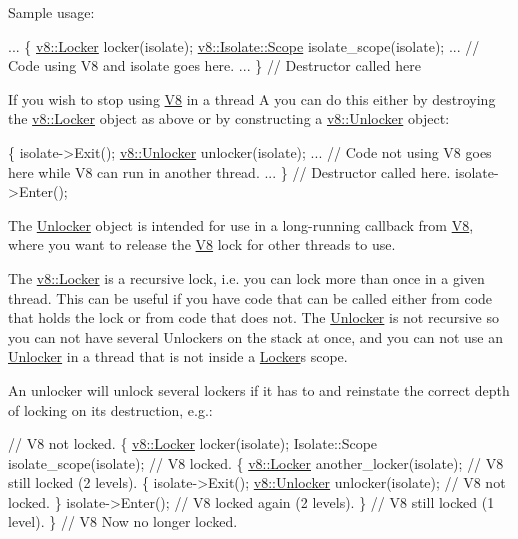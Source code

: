 Sample usage\+: 
\begin{DoxyCode}
...
\{
  \mbox{\hyperlink{classv8_1_1Locker}{v8::Locker}} locker(isolate);
  \mbox{\hyperlink{classv8_1_1Isolate_1_1Scope}{v8::Isolate::Scope}} isolate\_scope(isolate);
  ...
  \textcolor{comment}{// Code using V8 and isolate goes here.}
  ...
\} \textcolor{comment}{// Destructor called here}
\end{DoxyCode}


If you wish to stop using \mbox{\hyperlink{classv8_1_1V8}{V8}} in a thread A you can do this either by destroying the \mbox{\hyperlink{classv8_1_1Locker}{v8\+::\+Locker}} object as above or by constructing a \mbox{\hyperlink{classv8_1_1Unlocker}{v8\+::\+Unlocker}} object\+:


\begin{DoxyCode}
\{
  isolate->Exit();
  \mbox{\hyperlink{classv8_1_1Unlocker}{v8::Unlocker}} unlocker(isolate);
  ...
  \textcolor{comment}{// Code not using V8 goes here while V8 can run in another thread.}
  ...
\} \textcolor{comment}{// Destructor called here.}
isolate->Enter();
\end{DoxyCode}


The \mbox{\hyperlink{classv8_1_1Unlocker}{Unlocker}} object is intended for use in a long-\/running callback from \mbox{\hyperlink{classv8_1_1V8}{V8}}, where you want to release the \mbox{\hyperlink{classv8_1_1V8}{V8}} lock for other threads to use.

The \mbox{\hyperlink{classv8_1_1Locker}{v8\+::\+Locker}} is a recursive lock, i.\+e. you can lock more than once in a given thread. This can be useful if you have code that can be called either from code that holds the lock or from code that does not. The \mbox{\hyperlink{classv8_1_1Unlocker}{Unlocker}} is not recursive so you can not have several Unlockers on the stack at once, and you can not use an \mbox{\hyperlink{classv8_1_1Unlocker}{Unlocker}} in a thread that is not inside a \mbox{\hyperlink{classv8_1_1Locker}{Locker}}\textquotesingle{}s scope.

An unlocker will unlock several lockers if it has to and reinstate the correct depth of locking on its destruction, e.\+g.\+:


\begin{DoxyCode}
\textcolor{comment}{// V8 not locked.}
\{
  \mbox{\hyperlink{classv8_1_1Locker}{v8::Locker}} locker(isolate);
  Isolate::Scope isolate\_scope(isolate);
  \textcolor{comment}{// V8 locked.}
  \{
    \mbox{\hyperlink{classv8_1_1Locker}{v8::Locker}} another\_locker(isolate);
    \textcolor{comment}{// V8 still locked (2 levels).}
    \{
      isolate->Exit();
      \mbox{\hyperlink{classv8_1_1Unlocker}{v8::Unlocker}} unlocker(isolate);
      \textcolor{comment}{// V8 not locked.}
    \}
    isolate->Enter();
    \textcolor{comment}{// V8 locked again (2 levels).}
  \}
  \textcolor{comment}{// V8 still locked (1 level).}
\}
\textcolor{comment}{// V8 Now no longer locked.}
\end{DoxyCode}
 

